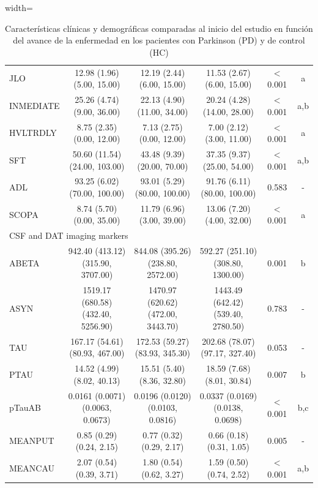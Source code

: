 \begin{description}
\begin{table}[t]
\begin{adjustbox}{width=\textwidth}
\begin{tabular}{|l||c|c|c|c|c|}
				JLO &         12.98 (1.96) (5.00, 15.00) &         12.19 (2.44) (6.00, 15.00) &         11.53 (2.67) (6.00, 15.00) & $<$ 0.001 &        a \\
				INMEDIATE &         25.26 (4.74) (9.00, 36.00) &        22.13 (4.90) (11.00, 34.00) &        20.24 (4.28) (14.00, 28.00) & $<$ 0.001 &      a,b \\
				HVLTRDLY &          8.75 (2.35) (0.00, 12.00) &          7.13 (2.75) (0.00, 12.00) &          7.00 (2.12) (3.00, 11.00) & $<$ 0.001 &        a \\
				SFT &      50.60 (11.54) (24.00, 103.00) &        43.48 (9.39) (20.00, 70.00) &        37.35 (9.37) (25.00, 54.00) & $<$ 0.001 &      a,b \\
				ADL &       93.25 (6.02) (70.00, 100.00) &       93.01 (5.29) (80.00, 100.00) &       91.76 (6.11) (80.00, 100.00) &     0.583 &   -   \\
				SCOPA &          8.74 (5.70) (0.00, 35.00) &         11.79 (6.96) (3.00, 39.00) &         13.06 (7.20) (4.00, 32.00) & $<$ 0.001 &        a \\
				\hline
				\multicolumn{6}{|l|}{CSF and DAT imaging markers} \\
				\hline
				ABETA &  942.40 (413.12) (315.90, 3707.00) &  844.08 (395.26) (238.80, 2572.00) &  592.27 (251.10) (308.80, 1300.00) &     0.001 &        b \\
				ASYN & 1519.17 (680.58) (432.40, 5256.90) & 1470.97 (620.62) (472.00, 3443.70) & 1443.49 (642.42) (539.40, 2780.50) &     0.783 &  -    \\
				TAU &     167.17 (54.61) (80.93, 467.00) &     172.53 (59.27) (83.93, 345.30) &     202.68 (78.07) (97.17, 327.40) &     0.053 &   -   \\
				PTAU &         14.52 (4.99) (8.02, 40.13) &         15.51 (5.40) (8.36, 32.80) &         18.59 (7.68) (8.01, 30.84) &     0.007 &        b \\
				pTauAB &   0.0161 (0.0071) (0.0063, 0.0673) &   0.0196 (0.0120) (0.0103, 0.0816) &   0.0337 (0.0169) (0.0138, 0.0698) & $<$ 0.001 &      b,c \\
				MEANPUT &           0.85 (0.29) (0.24, 2.15) &           0.77 (0.32) (0.29, 2.17) &           0.66 (0.18) (0.31, 1.05) &     0.005 &    -      \\
				MEANCAU &           2.07 (0.54) (0.39, 3.71) &           1.80 (0.54) (0.62, 3.27) &           1.59 (0.50) (0.74, 2.52) & $<$ 0.001 &      a,b \\ 
				\bottomrule
			\end{tabular}
		\end{adjustbox}
		\caption{Características clínicas y demográficas comparadas al inicio del estudio en función del avance de la enfermedad en los pacientes con Parkinson (PD) y de control (HC)}
		\label{tab:tabla2}
	\end{table}
	
\end{description}






